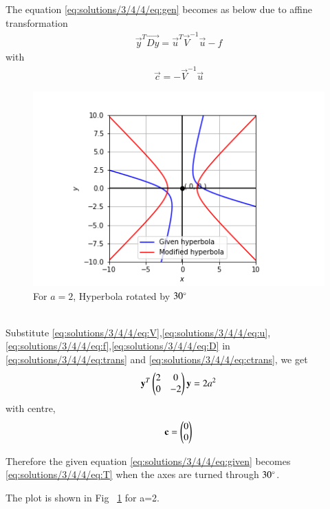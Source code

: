 The equation \eqref{eq:solutions/3/4/4/eq:gen} becomes as below due to affine transformation
\begin{align}
    \vec{y}^T\vec{Dy}=\vec{u}^T\vec{V}^{-1}\vec{u}-f\label{eq:solutions/3/4/4/eq:trans}
\end{align}
with 
\begin{align}
    \vec{c}=-\vec{V}^{-1}\vec{u}\label{eq:solutions/3/4/4/eq:ctrans}
\end{align}
\renewcommand{\thefigure}{1}
\begin{figure}[ht!]
    \centering
    \includegraphics[width=\columnwidth]{./solutions/3/4/4/Figure}
    \caption{For $a=2$, Hyperbola rotated by $30\degree$}
    \label{eq:solutions/3/4/4/fig:figure1}
\end{figure}\\
Substitute \eqref{eq:solutions/3/4/4/eq:V},\eqref{eq:solutions/3/4/4/eq:u},\eqref{eq:solutions/3/4/4/eq:f},\eqref{eq:solutions/3/4/4/eq:D} in \eqref{eq:solutions/3/4/4/eq:trans} and \eqref{eq:solutions/3/4/4/eq:ctrans}, we get
\begin{align}
    \mathbf{y}^T\begin{pmatrix}2 & 0 \\ 0 & -2\end{pmatrix}\mathbf{y}=2a^2\label{eq:solutions/3/4/4/eq:T}
\end{align}
with centre,
\begin{align}
    \mathbf{c}=\begin{pmatrix}0 \\ 0\end{pmatrix}
\end{align}

Therefore the given equation \eqref{eq:solutions/3/4/4/eq:given} becomes \eqref{eq:solutions/3/4/4/eq:T} when the axes are turned through $30\degree$.

The plot is shown in Fig ~\ref{eq:solutions/3/4/4/fig:figure1} for a=2.
